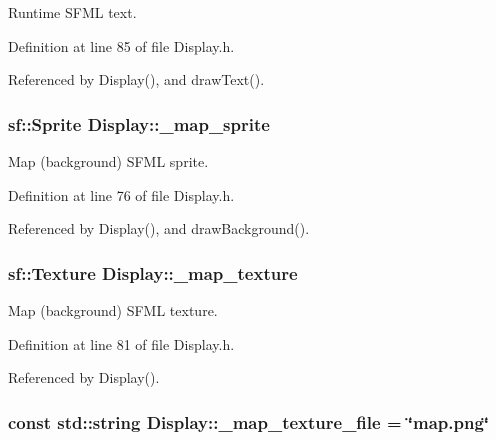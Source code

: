 Runtime S\-F\-M\-L text. 



Definition at line 85 of file Display.\-h.



Referenced by Display(), and draw\-Text().

\hypertarget{classDisplay_a2ec82cf1355d968c3863c9089ab2e511}{
\subsubsection[{\-\_\-map\-\_\-sprite}]{\setlength{\rightskip}{0pt plus 5cm}sf\-::\-Sprite Display\-::\-\_\-map\-\_\-sprite\hspace{0.3cm}{\ttfamily [private]}}}\label{classDisplay_a2ec82cf1355d968c3863c9089ab2e511}


Map (background) S\-F\-M\-L sprite. 



Definition at line 76 of file Display.\-h.



Referenced by Display(), and draw\-Background().

\hypertarget{classDisplay_aa98ca168c20ac56fe56def6686cf9f91}{
\subsubsection[{\-\_\-map\-\_\-texture}]{\setlength{\rightskip}{0pt plus 5cm}sf\-::\-Texture Display\-::\-\_\-map\-\_\-texture\hspace{0.3cm}{\ttfamily [private]}}}\label{classDisplay_aa98ca168c20ac56fe56def6686cf9f91}


Map (background) S\-F\-M\-L texture. 



Definition at line 81 of file Display.\-h.



Referenced by Display().

\hypertarget{classDisplay_ac3bdb11a00913038ceeee3171fa99ea3}{
\subsubsection[{\-\_\-map\-\_\-texture\-\_\-file}]{\setlength{\rightskip}{0pt plus 5cm}const std\-::string Display\-::\-\_\-map\-\_\-texture\-\_\-file = \char`\"{}map.\-png\char`\"{}\hspace{0.3cm}{\ttfamily [private]}}}\label{classDisplay_ac3bdb11a00913038ceeee3171fa99ea3}


